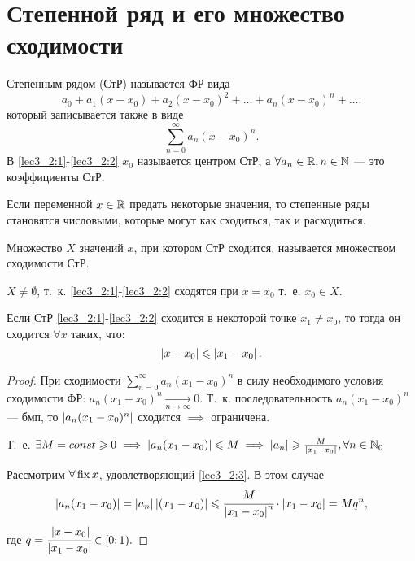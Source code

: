 \documentclass[../../main.tex]{subfiles}
\begin{document}
\section{Степенной ряд и его множество сходимости}

Степенным рядом (СтР) называется ФР вида
\begin{equation}\label{lec3_2:1}
a_0+a_1(x-x_0)+a_2(x-x_0)^2+\dots+a_n(x-x_0)^n+\dots.
\end{equation}
который записывается также в виде
\begin{equation}\label{lec3_2:2}
\sum_{n=0}^{\infty}a_n(x-x_0)^n.
\end{equation}
В \ref{lec3_2:1}-\ref{lec3_2:2} $x_0$ называется центром СтР, 
а $\forall a_n \in \mathbb{R}, n\in \mathbb{N}$ --- это коэффициенты СтР.

Если переменной $x\in\mathbb{R}$ предать некоторые значения, 
то степенные ряды становятся числовыми, которые могут как сходиться, 
так и расходиться.

Множество $X$ значений $x$, при котором СтР сходится, 
называется множеством сходимости СтР. 

$X \neq \emptyset$, т.~к. \ref{lec3_2:1}-\ref{lec3_2:2} 
сходятся при $x=x_0$ т.~е. $x_0\in X$.

\begin{lem}
	Если СтР \ref{lec3_2:1}-\ref{lec3_2:2} сходится в некоторой 
	точке $x_1\neq x_0$, то тогда он сходится $\forall x$ таких, что:
	\begin{equation}\label{lec3_2:3}
		 \left|{ x - x_0}\right| \leqslant \left|{x_1 - x_0}\right|.
	\end{equation}
\end{lem}
\begin{proof}
	При сходимости $\sum_{n=0}^{\infty}a_n(x_1-x_0)^n$ в силу необходимого
	 условия сходимости ФР: $a_n(x_1-x_0)^n\underset{n\to\infty}{\rightarrow}0$. 
	Т.~к. последовательность $a_n(x_1-x_0)^n$ --- бмп, 
	то $\left|{a_n(x_1-x_0)^n}\right|$ сходится $\implies$ ограничена.
	
	Т.~е. $\exists M=const \geqslant0 \implies \left|{a_n(x_1-x_0)}\right| \leqslant M
	\implies \left|{a_n}\right|\geqslant \frac{M}{\left|{x_1-x_0}\right|}, \forall n\in\mathbb{N}_0$
	
	Рассмотрим $\forall \operatorname{fix} x $, удовлетворяющий \ref{lec3_2:3}. 
	В этом случае  
	\begin{equation*}
		\left|{a_n(x_1-x_0)}\right| = \left|{a_n}\right|\left|{(x_1-x_0)}\right|\leqslant 
		\cfrac{M}{\left|{x_1-x_0}\right|^n}\cdot \left|{x_1-x_0}\right|=Mq^n,
	\end{equation*}
	где $q=\cfrac{\left|{x-x_0}\right|}{\left|{x_1-x_0}\right|}\in{\left[0;1\right)}.$
\end{proof}	
\end{document}
